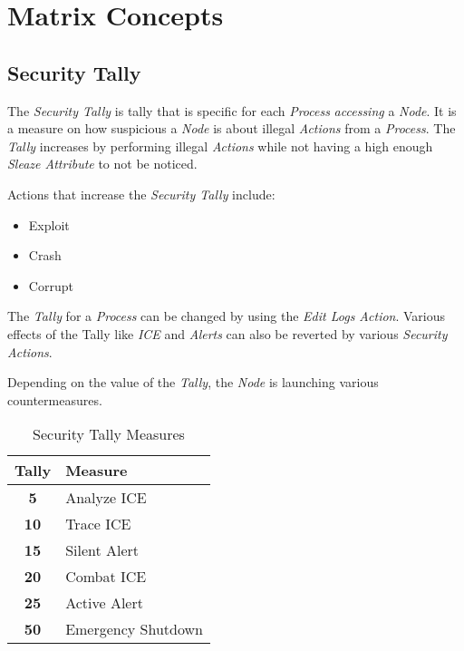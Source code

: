 \section{Matrix Concepts}

\subsection{Security Tally}

The \emph{Security Tally} is tally that is specific for each \emph{Process}
\emph{accessing} a \emph{Node}. It is a measure on how suspicious a \emph{Node} is
about illegal \emph{Actions} from a \emph{Process}. The \emph{Tally} increases by
performing illegal \emph{Actions} while not having a high enough
\emph{Sleaze Attribute} to not be noticed.

Actions that increase the \emph{Security Tally} include:

\begin{itemize}[parsep=0em]
    \item Exploit
    \item Crash
    \item Corrupt
\end{itemize}

The \emph{Tally} for a \emph{Process} can be changed by using the
\emph{Edit Logs Action}. Various effects of the Tally like \emph{ICE} and
\emph{Alerts} can  also be reverted by various \emph{Security Actions}.

Depending on the value of the \emph{Tally}, the \emph{Node} is launching
various countermeasures.

\begin{table}[htb]
    \caption[Security Tally Measures]{Security Tally Measures}
    \label{tab:tally measures}
    \centering
    \begin{tabular}{cl}
        \toprule
        \textbf{Tally} & \textbf{Measure}   \\
        \midrule
        \textbf{5}     & Analyze ICE        \\
        \textbf{10}    & Trace ICE          \\
        \textbf{15}    & Silent Alert       \\
        \textbf{20}    & Combat ICE         \\
        \textbf{25}    & Active Alert       \\
        \textbf{50}    & Emergency Shutdown \\
        \bottomrule
    \end{tabular}
\end{table}


